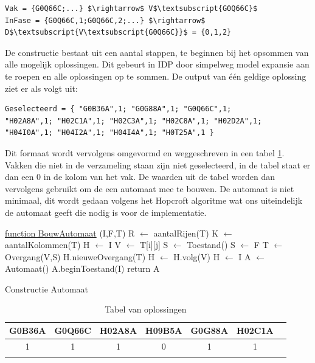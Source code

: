 \begin{lstlisting}[mathescape, caption=IDP Syntax conversion, frame=single]
Vak = {G0Q66C;...} $\rightarrow$ V$\textsubscript{G0Q66C}$
InFase = {G0Q66C,1;G0Q66C,2;...} $\rightarrow$ D$\textsubscript{V\textsubscript{G0Q66C}}$ = {0,1,2}
\end{lstlisting}

De constructie bestaat uit een aantal stappen, te beginnen bij het opsommen van alle mogelijk oplossingen. Dit gebeurt in IDP door simpelweg model expansie aan te roepen en alle oplossingen op te sommen. De output van \'{e}\'{e}n geldige oplossing ziet er als volgt uit:
\begin{lstlisting}[mathescape, caption=IDP model, frame=single]
Geselecteerd = { "G0B36A",1; "G0G88A",1; "G0Q66C",1; 
"H02A8A",1; "H02C1A",1; "H02C3A",1; "H02C8A",1; "H02D2A",1;
"H04I0A",1; "H04I2A",1; "H04I4A",1; "H0T25A",1 }
\end{lstlisting}
Dit formaat wordt vervolgens omgevormd en weggeschreven in een tabel \ref{oplossingen}. Vakken die niet in de verzameling staan zijn niet geselecteerd, in de tabel staat er dan een 0 in de kolom van het vak. De waarden uit de tabel worden dan vervolgens gebruikt om de een automaat mee te bouwen. De automaat is niet minimaal, dit wordt gedaan volgens het Hopcroft algoritme wat ons uiteindelijk de automaat geeft die nodig is voor de implementatie.

\begin{algorithm}
	\underline{function BouwAutomaat} (I,F,T)\;
	R $\leftarrow$ aantalRijen(T) \;
	K $\leftarrow$ aantalKolommen(T) \;
	H $\leftarrow$ I \;
		{
			{
			V $\leftarrow$ T[i][j] \;
				{
					{
					S $\leftarrow$ Toestand() \;
					}
					{
					S $\leftarrow$ F \;
					}
				T $\leftarrow$ Overgang(V,S) \;
				H.nieuweOvergang(T) \;
				}
			H $\leftarrow$ H.volg(V) \;
			}
		H $\leftarrow$ I \;
		}
	A $\leftarrow$ Automaat() \;
	A.beginToestand(I) \;
	return A \;
	\caption{Constructie Automaat\label{alg:fsaConstruction}}
\end{algorithm}

\begin{table}[]
\centering
\caption{Tabel van oplossingen}
\label{oplossingen}
\begin{tabular}{|c|c|c|c|c|c|c}
\hline
G0B36A & G0Q66C & H02A8A & H09B5A & G0G88A & H02C1A &  \\ \hline
1 & 1 & 1 & 0 & 1 & 1 &  \\ \hline
 &  &  &  &  &  & 
\end{tabular}
\end{table}

